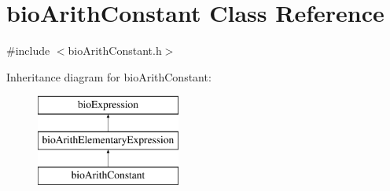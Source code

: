 \hypertarget{classbio_arith_constant}{}\section{bio\+Arith\+Constant Class Reference}
\label{classbio_arith_constant}


{\ttfamily \#include $<$bio\+Arith\+Constant.\+h$>$}

Inheritance diagram for bio\+Arith\+Constant\+:\begin{figure}[H]
\begin{center}
\leavevmode
\includegraphics[height=3.000000cm]{classbio_arith_constant}
\end{center}
\end{figure}
